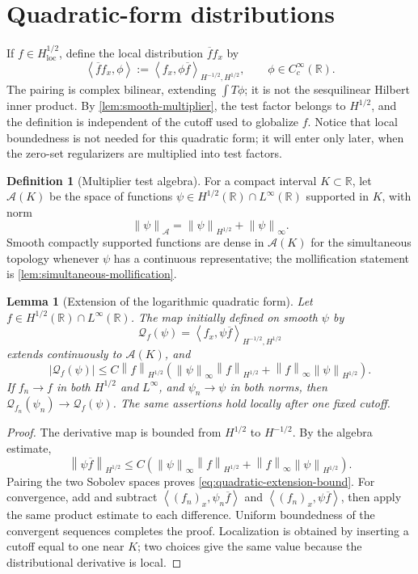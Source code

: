 \documentclass[11pt,oneside]{book}
\newtheorem{lemma}[theorem]{Lemma}
\theoremstyle{definition}
\newtheorem{definition}[theorem]{Definition}
\theoremstyle{remark}
\newcommand{\R}{\mathbb R}
\newcommand{\1}{\mathbf 1}
\newcommand{\loc}{\mathrm{loc}}
\newcommand{\norm}[1]{\left\lVert #1\right\rVert}
\newcommand{\pair}[2]{\left\langle #1,#2\right\rangle}
\begin{document}
\section{Quadratic-form distributions}
If $f\in H^{1/2}_{\loc}$, define the local distribution
$\overline f f_x$ by
\begin{equation}
 \pair{\overline f f_x}{\phi}
 :=\pair{f_x}{\phi\overline f}_{H^{-1/2},H^{1/2}},
 \qquad \phi\in C_c^\infty(\R).                   \label{eq:quad-form}
\end{equation}
The pairing is complex bilinear, extending $\int T\phi$; it is not the
sesquilinear Hilbert inner product.  By
\cref{lem:smooth-multiplier}, the test factor belongs to $H^{1/2}$, and the
definition is independent of the cutoff used to globalize $f$.  Notice that
local boundedness is not needed for this quadratic form; it will enter only
later, when the zero-set regularizers are multiplied into test factors.

\begin{definition}[Multiplier test algebra]\label{def:multiplier-test-algebra}
For a compact interval $K\subset\R$, let $\mathcal A(K)$ be the space of
functions $\psi\in H^{1/2}(\R)\cap L^\infty(\R)$ supported in $K$, with norm
\[
 \norm\psi_{\mathcal A}=\norm\psi_{H^{1/2}}+\norm\psi_\infty.
\]
Smooth compactly supported functions are dense in $\mathcal A(K)$ for the
simultaneous topology whenever $\psi$ has a continuous representative; the
mollification statement is \cref{lem:simultaneous-mollification}.
\end{definition}

\begin{lemma}[Extension of the logarithmic quadratic form]
\label{lem:quadratic-form-extension}
Let $f\in H^{1/2}(\R)\cap L^\infty(\R)$.  The map initially defined on
smooth $\psi$ by
\[
 \mathcal Q_f(\psi)=\pair{f_x}{\psi\overline f}_{H^{-1/2},H^{1/2}}
\]
extends continuously to $\mathcal A(K)$, and
\begin{equation}
 |\mathcal Q_f(\psi)|
 \le C\norm f_{H^{1/2}}
 \left(\norm\psi_\infty\norm f_{H^{1/2}}
       +\norm f_\infty\norm\psi_{H^{1/2}}\right).  \label{eq:quadratic-extension-bound}
\end{equation}
If $f_n\to f$ in both $H^{1/2}$ and $L^\infty$, and
$\psi_n\to\psi$ in both norms, then
$\mathcal Q_{f_n}(\psi_n)\to\mathcal Q_f(\psi)$.
The same assertions hold locally after one fixed cutoff.
\end{lemma}

\begin{proof}
The derivative map is bounded from $H^{1/2}$ to $H^{-1/2}$.  By the algebra
estimate,
\[
 \norm{\psi\overline f}_{H^{1/2}}
 \le C\left(\norm\psi_\infty\norm f_{H^{1/2}}
       +\norm f_\infty\norm\psi_{H^{1/2}}\right).
\]
Pairing the two Sobolev spaces proves \eqref{eq:quadratic-extension-bound}.
For convergence, add and subtract
$\pair{(f_n)_x}{\psi_n\overline f}$ and
$\pair{(f_n)_x}{\psi\overline f}$, then apply the same product estimate to
each difference.  Uniform boundedness of the convergent sequences completes
the proof.  Localization is obtained by inserting a cutoff equal to one near
$K$; two choices give the same value because the distributional derivative is
local.
\end{proof}
\end{document}
